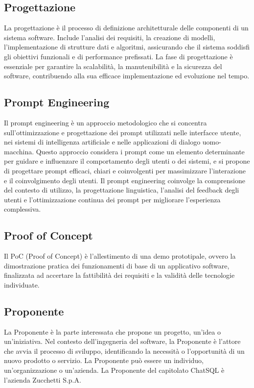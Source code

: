 \vspace{2em}
\subsection*{Progettazione}
\par La progettazione è il processo di definizione architetturale delle componenti di un sistema software. Include l'analisi dei requisiti, la creazione di modelli, l'implementazione di strutture dati e algoritmi, assicurando che il sistema soddisfi gli obiettivi funzionali e di performance prefissati. La fase di progettazione è essenziale per garantire la scalabilità, la manutenibilità e la sicurezza del software, contribuendo alla sua efficace implementazione ed evoluzione nel tempo.

\vspace{2em}
\subsection*{Prompt Engineering}
\par Il prompt engineering è un approccio metodologico che si concentra sull'ottimizzazione e progettazione dei prompt utilizzati nelle interfacce utente, nei sistemi di intelligenza artificiale e nelle applicazioni di dialogo uomo-macchina. Questo approccio considera i prompt come un elemento determinante per guidare e influenzare il comportamento degli utenti o dei sistemi, e si propone di progettare prompt efficaci, chiari e coinvolgenti per massimizzare l'interazione e il coinvolgimento degli utenti. Il prompt engineering coinvolge la comprensione del contesto di utilizzo, la progettazione linguistica, l'analisi del feedback degli utenti e l'ottimizzazione continua dei prompt per migliorare l'esperienza complessiva.

\vspace{2em}
\subsection*{Proof of Concept}
\par Il PoC (Proof of Concept) è l’allestimento di una demo prototipale, ovvero la dimostrazione pratica dei funzionamenti di base di un applicativo software, finalizzata ad accertare la fattibilità dei requisiti e la validità delle tecnologie individuate.

\vspace{2em}
\subsection*{Proponente}
\par La Proponente è la parte interessata che propone un progetto, un'idea o un'iniziativa. Nel contesto dell'ingegneria del software, la Proponente è l'attore che avvia il processo di sviluppo, identificando la necessità o l'opportunità di un nuovo prodotto o servizio. La Proponente può essere un individuo, un'organizzazione o un'azienda. La Proponente del capitolato ChatSQL è l'azienda Zucchetti S.p.A.

